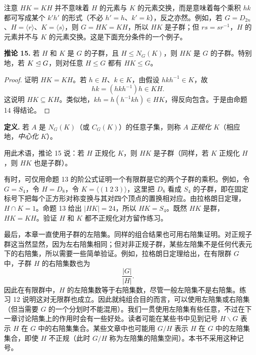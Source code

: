 注意 $HK=KH$ 并不意味着 $H$ 的元素与 $K$ 的元素交换，而是意味着每个乘积 $hk$ 都可写成某个 $k'h'$ 的形式（不必 $h'=h$、$k'=k$），反之亦然。例如，若 $G=D_{2n}$、$H=\langle r\rangle$、$K=\langle s\rangle$，则 $G=HK=KH$，所以 $HK$ 是子群；但 $rs=sr^{-1}$，$H$ 的元素并不与 $K$ 的元素交换。这是下面充分条件的一个例子。

\medskip
\noindent\textbf{推论 15.} 若 $H$ 和 $K$ 是 $G$ 的子群，且 $H\leq N_G(K)$，则 $HK$ 是 $G$ 的子群。特别地，若 $K\trianglelefteq G$，则对任意 $H\leq G$ 都有 $HK\leq G$。

\begin{proof}
证明 $HK=KH$。若 $h\in H$、$k\in K$，由假设 $hkh^{-1}\in K$，故
\[
  hk=(hkh^{-1})h\in KH.
\]
这说明 $HK\subseteq KH$。类似地，$kh=h(h^{-1}kh)\in HK$，得反向包含。于是由命题 14 得结论。
\end{proof}

\noindent\textbf{定义.} 若 $A$ 是 $N_G(K)$（或 $C_G(K)$）的任意子集，则称 $A$ \emph{正规化} $K$（相应地，\emph{中心化} $K$）。

用此术语，推论 15 说：若 $H$ 正规化 $K$，则 $HK$ 是子群（同样，若 $K$ 正规化 $H$，则 $HK$ 也是子群）。

有时，可仅用命题 13 的阶公式证明一个有限群是它的两个子群的乘积。例如，令 $G=S_4$，令 $H=D_8$，令 $K=\langle(1\ 2\ 3)\rangle$，这里把 $D_8$ 看成 $S_4$ 的子群，即在固定标号下把每个正方形对称变换与其对四个顶点的置换相对应。由拉格朗日定理，$H\cap K=1$。命题 13 给出 $|HK|=24$，所以 $HK=S_4$。既然 $HK$ 是群，$HK=KH$。验证 $H$ 和 $K$ 都不正规化对方留作练习。

最后，本章一直使用子群的左陪集。同样的组合结果也可用右陪集证明。对正规子群这当然显然，因为左右陪集相同；但对非正规子群，某些左陪集不是任何代表元下的右陪集，所以需要一些简单验证。例如，拉格朗日定理给出，在有限群 $G$ 中，子群 $H$ 的右陪集数也为
\[
  \frac{|G|}{|H|}.
\]
因此在有限群中，$H$ 的左陪集数等于右陪集数，尽管一般左陪集不是右陪集。练习 12 说明这对无限群也成立。因此就纯组合目的而言，可以使用左陪集或右陪集（但当需要 $G$ 的一个分划时不能混用）。我们一贯使用左陪集有些任意，不过在下一章讨论陪集上的作用时会有一些好处。读者可能在某些书中见到记号 $H\backslash G$ 表示 $H$ 在 $G$ 中的右陪集集合。某些文章中也可能用 $G/H$ 表示 $H$ 在 $G$ 中的左陪集集合，即使 $H$ 不正规（此时 $G/H$ 称为左陪集的陪集空间）。本书不采用这种记号。

